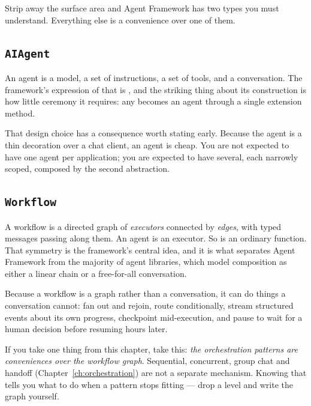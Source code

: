 Strip away the surface area and Agent Framework has two types you must
understand. Everything else is a convenience over one of them.

\subsection{\texttt{AIAgent}}

An agent is a model, a set of instructions, a set of tools, and a conversation.
The framework's expression of that is , and the striking thing about
its construction is how little ceremony it requires: any 
becomes an agent through a single extension method.

That design choice has a consequence worth stating early. Because the agent is a
thin decoration over a chat client, an agent is cheap. You are not expected to
have one agent per application; you are expected to have several, each narrowly
scoped, composed by the second abstraction.

\subsection{\texttt{Workflow}}

A workflow is a directed graph of \emph{executors} connected by \emph{edges},
with typed messages passing along them. An agent is an executor. So is an
ordinary function. That symmetry is the framework's central idea, and it is what
separates Agent Framework from the majority of agent libraries, which model
composition as either a linear chain or a free-for-all conversation.

Because a workflow is a graph rather than a conversation, it can do things a
conversation cannot: fan out and rejoin, route conditionally, stream structured
events about its own progress, checkpoint mid-execution, and pause to wait for a
human decision before resuming hours later.

\begin{note}
If you take one thing from this chapter, take this: \emph{the orchestration
patterns are conveniences over the workflow graph}. Sequential, concurrent, group
chat and handoff (Chapter~\ref{ch:orchestration}) are not a separate mechanism.
Knowing that tells you what to do when a pattern stops fitting --- drop a level
and write the graph yourself.
\end{note}

